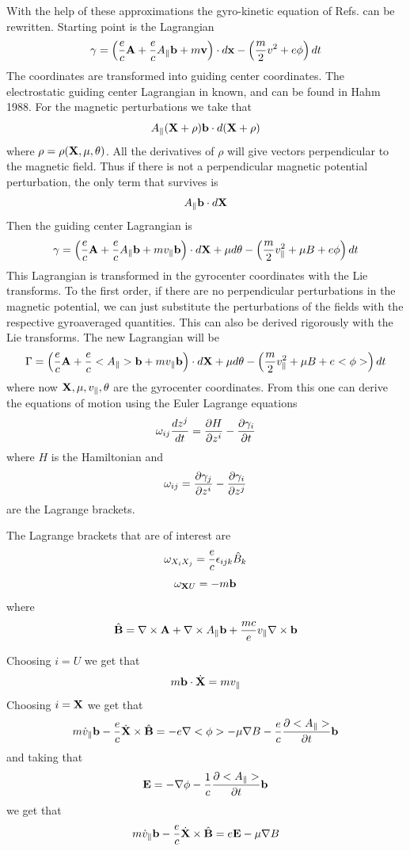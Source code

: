 \documentclass{report}
\def\be{\begin{equation}}
\def\ee{\end{equation}}
\begin{document}
With the help of these approximations the gyro-kinetic equation of Refs. \cite{LIT83,HAH88,BRI88,SUG00}
can be rewritten. Starting point is the Lagrangian 
\be
\gamma=\left({e\over c}{\bf A}+{e\over c}A_{\parallel}{\bf b}+m{\bf v} \right)\cdot d{\bf x}-\left({m\over 2}v^{2}+e\phi \right)dt
\ee
The coordinates are transformed into guiding center coordinates. The electrostatic guiding center
Lagrangian in known, and can be found in Hahm 1988. For the magnetic perturbations we take that
\be
A_{\parallel}({\bf X}+{\bf \rho}){\bf b} \cdot d({\bf X}+\rho)
\ee
where $\rho =\rho({\bf X},{\mu},{\theta})$. All the derivatives of $\rho$ will give vectors
perpendicular to the magnetic field. Thus if there is not a perpendicular magnetic potential
perturbation, the only term that survives is
$$A_{\parallel}{\bf b}\cdot d{\bf X}$$
Then the guiding center Lagrangian is
\be
\gamma =\left({e\over c}{\bf A}+{e\over c}A_{\parallel}{\bf b}+mv_{\parallel}{\bf b} \right)\cdot 
d{\bf X}+\mu d\theta -\left({m\over 2}v_{\parallel}^{2}+\mu B+e\phi \right)dt
\ee
This Lagrangian is transformed in the gyrocenter coordinates with the Lie transforms.
To the first order, if there are no perpendicular perturbations in the magnetic potential,
we can just substitute the perturbations of the fields with the respective gyroaveraged quantities. 
This can also be derived rigorously with the Lie transforms. The new Lagrangian will be
\be
\Gamma =\left({e\over c}{\bf A}+{e\over c}<A_{\parallel}>{\bf b}+mv_{\parallel}{\bf b} \right)\cdot 
d{\bf X}+\mu d\theta -\left({m\over 2}v_{\parallel}^{2}+\mu B+e<\phi> \right)dt
\ee
where now ${\bf X},\mu,v_{\parallel},\theta$ are the gyrocenter coordinates. From this one can derive 
the equations of motion using the Euler Lagrange equations
\be
\omega_{ij}{dz^{j}\over dt}={\partial H \over \partial z^{i}}-{\partial \gamma_{i}\over \partial t}
\ee
where $H$ is the Hamiltonian and 
\be
\omega_{ij}={\partial \gamma_{j}\over \partial z^{i}}-{\partial \gamma_{i}\over \partial z^{j}}
\ee
are the Lagrange brackets.

The Lagrange brackets that are of interest are
\be
\omega_{X_{i}X_{j}}={e\over c}\epsilon_{ijk}{\hat B}_{k}
\ee
\be
\omega_{{\bf X}U}=-m{\bf b}
\ee
where 
\be
{\hat {\bf B}}=\nabla \times {\bf A}+\nabla \times A_{\parallel}{\bf b}+{mc \over e}v_{\parallel}\nabla \times {\bf b}
\ee

Choosing $i=U$ we get that
\be
m{\bf b}\cdot {\dot {\bf X}}=mv_{\parallel}
\ee
Choosing $i={\bf X}$ we get that
\be
m{\dot v}_{\parallel}{\bf b}-{e\over c}{\dot {\bf X}}\times {\hat{\bf B}}=-e\nabla <\phi>-\mu \nabla B-{e\over c}
{\partial <A_{\parallel}>\over \partial t}{\bf b}
\ee
and taking that
\be
{\bf E}=-\nabla \phi -{1\over c}{\partial <A_{\parallel}>\over \partial t}{\bf b}
\ee
we get that
\be
m{\dot v}_{\parallel}{\bf b}-{e\over c}{\dot {\bf X}}\times {\hat{\bf B}}=e{\bf E}-\mu \nabla B
\ee
\end{document}
